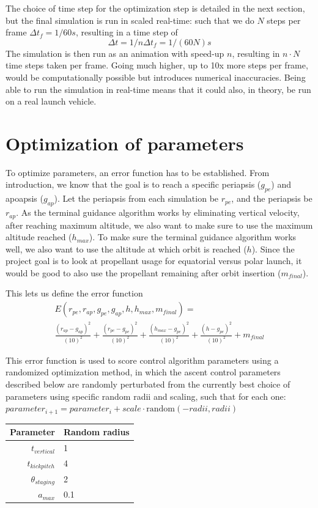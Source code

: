 \documentclass[11pt]{article}
\begin{document}
The choice of time step for the optimization step is detailed in the next section, but the final simulation is run in scaled real-time: such that we do $N$ steps per frame $\Delta t_f = 1/60 s$, resulting
in a time step of 
$$
\Delta t = 1/n \Delta  t_f = 1/(60N) s
$$ 
The simulation is then run as an animation with speed-up $n$, resulting in $n \cdot N$ time steps taken per frame. 
Going much higher, up to 10x more steps per frame, would be computationally possible but introduces
numerical inaccuracies. Being able to run the simulation in real-time means that it could also, in theory, be run on a real launch vehicle.

\section{Optimization of parameters} \label{sec:optimize}
To optimize parameters, an error function has to be established.
From introduction, we know that the goal is to reach a specific periapsis ($g_{pe}$) and apoapsis ($g_{ap}$). 
Let the periapsis from each simulation be $r_{pe}$, and the periapsis be $r_{ap}$.
As the terminal guidance algorithm works by eliminating vertical velocity, after reaching maximum altitude, we also want to make sure to use the maximum altitude reached ($h_{max}$).
To make sure the terminal guidance algorithm works well, we also want to use the altitude at which orbit is reached ($h$).
Since the project goal is to look at propellant usage for equatorial versus polar launch, it would be good to also use the propellant remaining after orbit insertion ($m_{final}$).

This lets us define the error function
$$
\begin{aligned}
E(r_{pe}, r_{ap}, g_{pe}, g_{ap}, h, h_{max}, m_{final}) = \\
\frac{{\left( r_{ap} - g_{ap} \right)}^2}{{\left( 10 \right)}^2} +
\frac{{\left( r_{pe} - g_{pe} \right)}^2}{{\left( 10 \right)}^2} +
\frac{{\left( h_{max} - g_{pe} \right)}^2}{{\left( 10 \right)}^2} +
\frac{{\left( h - g_{pe} \right)}^2}{{\left( 10 \right)}^2}
+ m_{final}
\end{aligned}
$$

This error function is used to score control algorithm parameters using a randomized optimization method, in which the ascent control parameters described below 
are randomly perturbated from the currently best choice of parameters using specific random radii and scaling, such that for each one: $parameter_{i+1} = parameter_{i} + scale \cdot \text{random}(-radii, radii)$
\begin{center}
  \begin{tabular}{ r | l  }
    Parameter & Random radius \\
    \hline
    $t_{vertical}$ & 1 \\
    $t_{kickpitch}$ & 4 \\
    $\theta_{staging}$ & 2 \\
    $a_{max}$ & 0.1 \\
  \end{tabular}
\end{center}
\end{document}
